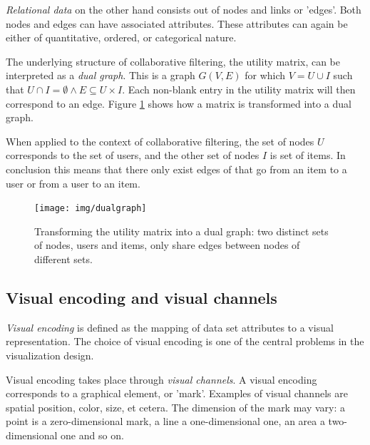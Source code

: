 \emph{Relational data} on the other hand consists out of nodes and links or 'edges'\cite{keim:2002, shirley:2009}. Both nodes and edges can have associated attributes. These attributes can again be either of quantitative, ordered, or categorical nature.

The underlying structure of collaborative filtering, the utility matrix, can be interpreted as a \emph{dual graph}. This is a graph $G(V,E)$ for which $V = U \cup I$ such that $U \cap I = \emptyset \wedge E \subseteq U \times I$\cite{dekimpe:2007}. Each non-blank entry in the utility matrix will then correspond to an edge. Figure \ref{figure:dualgraph} shows how a matrix is transformed into a dual graph.

When applied to the context of collaborative filtering, the set of nodes $U$ corresponds to the set of users, and the other set of nodes $I$ is set of items. In conclusion this means that there only exist edges of that go from an item to a user or from a user to an item.

\begin{figure}%
	\begin{center}
		\texttt{[image: img/dualgraph]}
	\end{center}
	\caption{Transforming the utility matrix into a dual graph: two distinct sets of nodes, users and items, only share edges between nodes of different sets.}%
	\label{figure:dualgraph}%
\end{figure}




\subsection{Visual encoding and visual channels}\label{chapter:literature_study:section:interaction:subsection:encoding}


\emph{Visual encoding} is defined as the mapping of data set attributes to a visual representation. The choice of visual encoding is one of the central problems in the visualization design\cite{shirley:2009}.

Visual encoding takes place through \emph{visual channels}. A visual encoding corresponds to a graphical element, or 'mark'. Examples of visual channels are spatial position, color, size, et cetera. The dimension of the mark may vary: a point is a zero-dimensional mark, a line a one-dimensional one, an area a two-dimensional one and so on.

